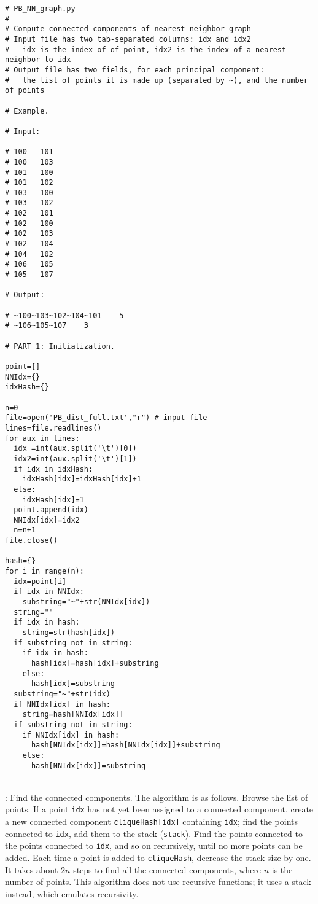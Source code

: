 \documentclass[10pt]{article}
\begin{document}
\begin{lstlisting}
# PB_NN_graph.py
#
# Compute connected components of nearest neighbor graph
# Input file has two tab-separated columns: idx and idx2
#   idx is the index of of point, idx2 is the index of a nearest neighbor to idx
# Output file has two fields, for each principal component:
#   the list of points it is made up (separated by ~), and the number of points

# Example. 

# Input:

# 100	101
# 100	103
# 101	100
# 101	102
# 103	100
# 103	102
# 102	101
# 102	100
# 102	103
# 102	104
# 104	102
# 106	105
# 105	107

# Output:

# ~100~103~102~104~101    5
# ~106~105~107    3

# PART 1: Initialization. 

point=[]
NNIdx={}
idxHash={}

n=0
file=open('PB_dist_full.txt',"r") # input file 
lines=file.readlines()
for aux in lines:
  idx =int(aux.split('\t')[0])
  idx2=int(aux.split('\t')[1])
  if idx in idxHash:
    idxHash[idx]=idxHash[idx]+1
  else:
    idxHash[idx]=1
  point.append(idx)
  NNIdx[idx]=idx2
  n=n+1
file.close()

hash={}
for i in range(n):
  idx=point[i]
  if idx in NNIdx:
    substring="~"+str(NNIdx[idx])
  string="" 
  if idx in hash:
    string=str(hash[idx])
  if substring not in string: 
    if idx in hash:
      hash[idx]=hash[idx]+substring 
    else:
      hash[idx]=substring  
  substring="~"+str(idx)
  if NNIdx[idx] in hash: 
    string=hash[NNIdx[idx]]
  if substring not in string: 
    if NNIdx[idx] in hash:
      hash[NNIdx[idx]]=hash[NNIdx[idx]]+substring 
    else:
      hash[NNIdx[idx]]=substring 
\end{lstlisting}
\quad \\
: Find the connected components. The algorithm is as follows. Browse the list of points. If a point \texttt{idx} has not yet been assigned to a connected component, 
create a new connected component \texttt{cliqueHash[idx]} containing \texttt{idx}; find the points connected to \texttt{idx}, 
add them to the stack (\texttt{stack}). Find the points connected to the points connected to \texttt{idx}, and so on recursively, until no more points can be added. Each time a point is added to \texttt{cliqueHash}, decrease the stack size by one. It takes
about $2n$ steps to find all the connected components, where $n$ is the number of points. This algorithm does not use recursive functions; it uses a stack instead, which emulates recursivity. 
\end{document}
